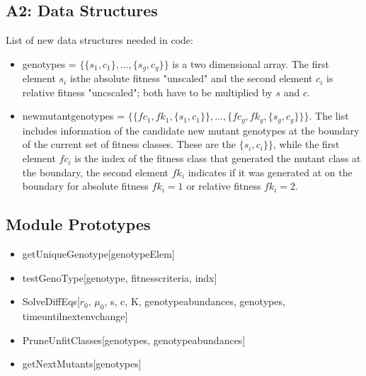 \documentclass{article}
\begin{document}
\subsection*{A2: Data Structures}
List of new data structures needed in code:
\begin{itemize}
\item{genotypes = $\{\{s_1,c_1\},...,\{s_g,c_g\}\}$ is a two dimensional array.  The first element $s_i$ isthe  absolute fitness "unscaled" and the second element $c_i$ is relative fitness "uncscaled"; both have to be multiplied by $s$ and $c$.}
\item{newmutantgenotypes = $\{\{fc_1,fk_1,\{s_1,c_1\}\},...,\{fc_g,fk_g,\{s_g,c_g\}\}\}$}.  The list includes information of the candidate new mutant genotypes at the boundary of the current set of fitness classes.  These are the $\{s_i,c_i\}\}$, while the first element $fc_i$ is the index of the fitness class that generated the mutant class at the boundary, the second element $fk_i$ indicates if it was generated at on the boundary for absolute fitness $fk_i=1$ or relative fitness $fk_i=2$.  
\end{itemize}
\subsection*{Module Prototypes}
\begin{itemize}
\item getUniqueGenotype[genotypeElem]\\
\item testGenoType[genotype, fitnesscriteria, indx]\\
\item SolveDiffEqs[$r_0$, $\mu_0$, s, c, K, genotypeabundances, genotypes, timeuntilnextenvchange]\\
\item PruneUnfitClasses[genotypes, genotypeabundances]\\
\item getNextMutants[genotypes]
\end{itemize}
\newpage
\end{document}
